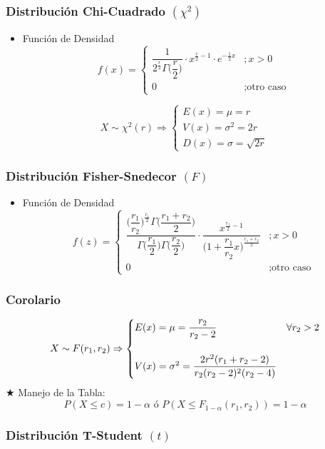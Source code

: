 \documentclass[10pt,letterpaper]{article}
\begin{document}
\subsubsection{Distribución Chi-Cuadrado $(\chi^2)$}
\begin{itemize}
\item Función de Densidad \\
$$
f(x)=
\begin{cases}
\dfrac{1}{2^{\frac{r}{2}}\Gamma\Big( \dfrac{r}{2} \Big)}\cdot x^{\frac{r}{2}-1} \cdot e^{-\frac{1}{2}x} &; x>0 \\
0 &; \text{otro caso}
\end{cases}
$$
\end{itemize}
$$
X\sim\chi^2(r)\Rightarrow
\begin{cases}
E(x)=\mu=r \\
V(x)=\sigma^2 = 2r \\
D(x)=\sigma=\sqrt{2r}
\end{cases}
$$

\subsubsection{Distribución Fisher-Snedecor $(F)$}
\begin{itemize}
\item Función de Densidad \\
$$
f(z)=
\begin{cases}
\dfrac{\Big(\dfrac{r_1}{r_2}\Big)^{\frac{r_1}{2}}\Gamma\Big(\dfrac{r_1+r_2}{2}\Big) }{\Gamma\Big(\dfrac{r_1}{2}\Big)\Gamma\Big(\dfrac{r_2}{2}\Big)}\cdot \dfrac{x^{\frac{r_1}{2}-1}}{\Big(1+\dfrac{r_1}{r_2}x\Big)^{\frac{r_1+r_2}{2}}} &;x>0 \\
0 &;\text{otro caso}
\end{cases}
$$
\end{itemize}
\subsubsection*{Corolario}
$$
X\sim F(r_1,r_2)\Rightarrow
\begin{cases}
E(x)=\mu=\dfrac{r_2}{r_2-2} & \forall r_2>2 \\\vspace{0.05cm} \\
V(x)=\sigma^2=\dfrac{2r^2(r_1+r_2-2)}{r_2(r_2-2)^2(r_2-4)}
\end{cases}
$$
\noindent$\bigstar$ Manejo de la Tabla:
$$P(X\leq c) = 1-\alpha \text{ ó } P(X\leq F_{1-\alpha}(r_1,r_2))=1-\alpha$$
\subsubsection{Distribución T-Student $(t)$}
\end{document}
